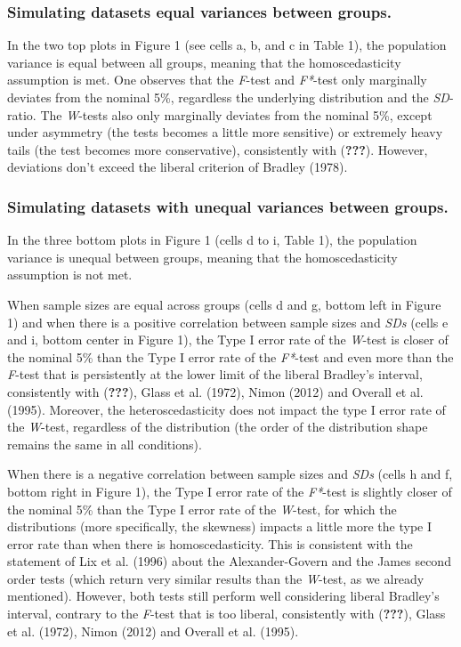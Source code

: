 \documentclass[man,floatsintext]{apa6}
\begin{document}
\subsubsection{Simulating datasets equal variances between
groups.}\label{simulating-datasets-equal-variances-between-groups.}

In the two top plots in Figure 1 (see cells a, b, and c in Table 1), the
population variance is equal between all groups, meaning that the
homoscedasticity assumption is met. One observes that the \emph{F}-test
and \emph{F*}-test only marginally deviates from the nominal 5\%,
regardless the underlying distribution and the \emph{SD}-ratio. The
\emph{W}-tests also only marginally deviates from the nominal 5\%,
except under asymmetry (the tests becomes a little more sensitive) or
extremely heavy tails (the test becomes more conservative), consistently
with ({\textbf{???}}). However, deviations don't exceed the liberal
criterion of Bradley (1978).

\subsubsection{Simulating datasets with unequal variances between
groups.}\label{simulating-datasets-with-unequal-variances-between-groups.}

In the three bottom plots in Figure 1 (cells d to i, Table 1), the
population variance is unequal between groups, meaning that the
homoscedasticity assumption is not met.

When sample sizes are equal across groups (cells d and g, bottom left in
Figure 1) and when there is a positive correlation between sample sizes
and \emph{SDs} (cells e and i, bottom center in Figure 1), the Type I
error rate of the \emph{W}-test is closer of the nominal 5\% than the
Type I error rate of the \emph{F*}-test and even more than the
\emph{F}-test that is persistently at the lower limit of the liberal
Bradley's interval, consistently with ({\textbf{???}}), Glass et al.
(1972), Nimon (2012) and Overall et al. (1995). Moreover, the
heteroscedasticity does not impact the type I error rate of the
\emph{W}-test, regardless of the distribution (the order of the
distribution shape remains the same in all conditions).

When there is a negative correlation between sample sizes and \emph{SDs}
(cells h and f, bottom right in Figure 1), the Type I error rate of the
\emph{F*}-test is slightly closer of the nominal 5\% than the Type I
error rate of the \emph{W}-test, for which the distributions (more
specifically, the skewness) impacts a little more the type I error rate
than when there is homoscedasticity. This is consistent with the
statement of Lix et al. (1996) about the Alexander-Govern and the James
second order tests (which return very similar results than the
\emph{W}-test, as we already mentioned). However, both tests still
perform well considering liberal Bradley's interval, contrary to the
\emph{F}-test that is too liberal, consistently with ({\textbf{???}}),
Glass et al. (1972), Nimon (2012) and Overall et al. (1995).
\end{document}
